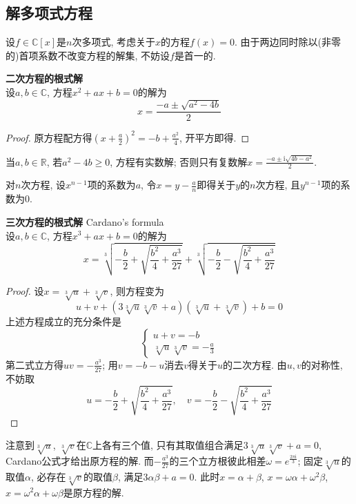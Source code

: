 \subsection{解多项式方程}

\par 设$f \in \mathbb{C}[x]$是$n$次多项式, 考虑关于$x$的方程$f(x)=0$. 由于两边同时除以(非零的)首项系数不改变方程的解集, 不妨设$f$是首一的. 

\begin{pro}  \textbf{二次方程的根式解}\\
设$a,b\in \mathbb{C}$, 方程$x^2+ax+b=0$的解为
\begin{equation}
    x = \frac{-a\pm \sqrt{a^2-4b}}{2}
\end{equation}
\end{pro}
\begin{proof}
原方程配方得$(x+\frac{a}{2})^2 = -b+\frac{a^2}{4}$, 开平方即得. 
\end{proof}
当$a,b\in \mathbb{R}$, 若$a^2-4b\ge 0$, 方程有实数解; 否则只有复数解$x=\frac{-a\pm \mathrm{i}\sqrt{4b-a^2}}{2}$. 

\par 对$n$次方程, 设$x^{n-1}$项的系数为$a$, 令$x= y-\frac{a}{n}$即得关于$y$的$n$次方程, 且$y^{n-1}$项的系数为$0$.

\begin{pro}  \textbf{三次方程的根式解} Cardano's formula\\
设$a,b\in \mathbb{C}$, 方程$x^3+ax+b=0$的解为
\begin{equation}
    x = \sqrt[3]{-\frac{b}{2} + \sqrt{\frac{b^2}{4}+\frac{a^3}{27}}} + \sqrt[3]{-\frac{b}{2} - \sqrt{\frac{b^2}{4}+\frac{a^3}{27}}}
\end{equation}
\end{pro}
\begin{proof}
设$x=\sqrt[3]{u}+\sqrt[3]{v}$, 则方程变为
\begin{equation}
    u + v + (3\sqrt[3]{u}\sqrt[3]{v}+a)(\sqrt[3]{u}+\sqrt[3]{v})+b = 0
\end{equation}
上述方程成立的充分条件是
\begin{equation}
    \begin{cases}
    u + v = -b \\
    \sqrt[3]{u}\sqrt[3]{v} = -\frac{a}{3}
    \end{cases}
\end{equation}
第二式立方得$uv = -\frac{a^3}{27}$; 用$v=-b-u$消去$v$得关于$u$的二次方程. 由$u,v$的对称性, 不妨取
\begin{equation}
    u = -\frac{b}{2} + \sqrt{\frac{b^2}{4}+\frac{a^3}{27}},\quad v = -\frac{b}{2} - \sqrt{\frac{b^2}{4}+\frac{a^3}{27}}
\end{equation}
\end{proof}
注意到$\sqrt[3]{u}$, $\sqrt[3]{v}$在$\mathbb{C}$上各有三个值, 只有其取值组合满足$3\sqrt[3]{u}\sqrt[3]{v}+a=0$, Cardano公式才给出原方程的解. 而$-\frac{a^3}{27}$的三个立方根彼此相差$\omega = e^{\frac{2\pi\mathrm{i}}{3}}$; 固定$\sqrt[3]{u}$的取值$\alpha$, 必存在$\sqrt[3]{v}$的取值$\beta$, 满足$3\alpha\beta+a=0$. 此时$x=\alpha+\beta$, $x=\omega\alpha+\omega^2\beta$, $x=\omega^2\alpha+\omega\beta$是原方程的解. 



